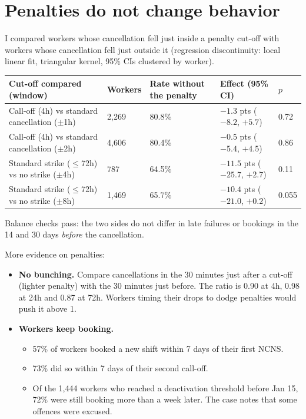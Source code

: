 \section{Penalties do not change behavior}
I compared workers whose cancellation fell just inside a penalty cut-off with workers whose cancellation fell just
outside it (regression discontinuity: local linear fit, triangular kernel, 95\% CIs clustered by worker).

\begin{center}\small
{}
\begin{tabularx}{\textwidth}{@{}LR{1.3cm}R{2.0cm}R{3.4cm}R{0.9cm}@{}}
\toprule
Cut-off compared (window) & Workers & Rate without the penalty & Effect (95\% CI) & $p$ \\
\midrule
Call-off (\lthan{}4h) vs standard cancellation ($\pm$1h) & 2,269 & 80.8\% & $-1.3$ pts ($-8.2$, $+5.7$) & 0.72 \\
Call-off (\lthan{}4h) vs standard cancellation ($\pm$2h) & 4,606 & 80.4\% & $-0.5$ pts ($-5.4$, $+4.5$) & 0.86 \\
Standard strike ($\le$72h) vs no strike ($\pm$4h) & 787 & 64.5\% & $-11.5$ pts ($-25.7$, $+2.7$) & 0.11 \\
Standard strike ($\le$72h) vs no strike ($\pm$8h) & 1,469 & 65.7\% & $-10.4$ pts ($-21.0$, $+0.2$) & 0.055 \\
\bottomrule
\end{tabularx}
\end{center}

Balance checks pass: the two sides do not differ in late failures or bookings in the 14 and 30 days \emph{before} the
cancellation.

More evidence on penalties:
\begin{itemize}
  \item \textbf{No bunching.} Compare cancellations in the 30 minutes just after a cut-off (lighter penalty) with the 30
  minutes just before. The ratio is 0.90 at 4h, 0.98 at 24h and 0.87 at 72h. Workers timing their drops to dodge
  penalties would push it above 1.
  \item \textbf{Workers keep booking.}
  \begin{itemize}
    \item 57\% of workers booked a new shift within 7 days of their first NCNS.
    \item 73\% did so within 7 days of their second call-off.
    \item Of the 1,444 workers who reached a deactivation threshold before Jan 15, 72\% were still booking more than a
    week later. The case notes that some offences were excused.
  \end{itemize}
\end{itemize}

